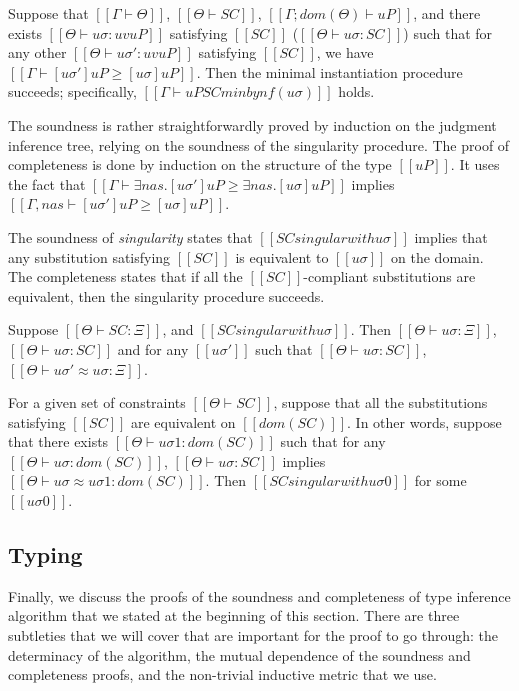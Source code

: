 \begin{lemma*}
    Suppose that $[[Γ ⊢ Θ]]$, $[[Θ ⊢ SC]]$, $[[Γ; dom(Θ) ⊢ uP]]$, and there exists 
    $[[Θ ⊢ uσ : uv uP ]]$ satisfying $[[SC]]$ ($[[Θ ⊢ uσ : SC]]$) 
    such that for any other $[[Θ ⊢ uσ' : uv uP ]]$
    satisfying $[[SC]]$, we have
    $[[Γ ⊢ [uσ']uP ≥ [uσ]uP ]]$.  Then the minimal instantiation procedure  
    succeeds; specifically, $[[Γ ⊢ uP SC minby nf(uσ) ]]$ holds.
\end{lemma*}

The soundness is rather straightforwardly proved by induction on the 
judgment inference tree, relying on the soundness of the singularity procedure.
The proof of completeness is done by induction on the structure of the type $[[uP]]$.
It uses the fact that $[[ Γ ⊢ ∃nas.[uσ']uP ≥ ∃nas.[uσ]uP]]$ implies
$[[ Γ, nas ⊢ [uσ']uP ≥ [uσ]uP]]$.

The soundness of \emph{singularity} states that $[[SC singular with uσ]]$
implies that any substitution satisfying $[[SC]]$ is equivalent to $[[uσ]]$ 
on the domain.  The completeness states that if all the 
$[[SC]]$-compliant substitutions are equivalent, then the singularity procedure succeeds. 

\begin{lemma*}
    \label{lemma:singularity-soundness}
    Suppose $[[Θ ⊢ SC : Ξ]]$, and $[[SC singular with uσ]]$. 
    Then $[[ Θ ⊢ uσ : Ξ ]]$,
     $[[ Θ ⊢ uσ : SC ]]$ and for any 
    $[[uσ']]$ such that $[[Θ ⊢ uσ : SC]]$,
    $[[Θ ⊢ uσ' ≈ uσ : Ξ]]$.
\end{lemma*}

\begin{lemma*}
    \label{lemma:singularity-completeness}
    For a given set of constraints $[[Θ ⊢ SC]]$,
    suppose that all the substitutions satisfying $[[SC]]$ are equivalent
    on $[[dom(SC)]]$.
    In other words, suppose that there exists $[[Θ ⊢ uσ1 : dom(SC)]]$ such that
    for any $[[Θ ⊢ uσ : dom(SC)]]$, $[[Θ ⊢ uσ : SC]]$ implies 
    $[[Θ ⊢ uσ ≈ uσ1 : dom(SC)]]$.
    Then $[[SC singular with uσ0]]$ for some $[[uσ0]]$.
\end{lemma*}

\subsection{Typing}

Finally, we discuss the proofs of the soundness and completeness of type
inference algorithm that we stated at the beginning of this section.
There are three subtleties that we will cover that are important 
for the proof to go through: the determinacy of the algorithm,
the mutual dependence of the soundness and completeness proofs, and
the non-trivial inductive metric that we use.


